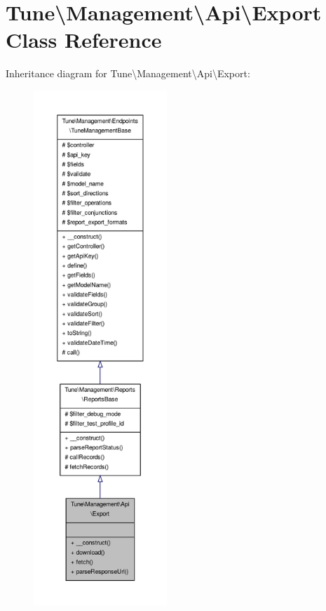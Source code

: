 \hypertarget{classTune_1_1Management_1_1Api_1_1Export}{\section{Tune\textbackslash{}Management\textbackslash{}Api\textbackslash{}Export Class Reference}
\label{classTune_1_1Management_1_1Api_1_1Export}
}


Inheritance diagram for Tune\textbackslash{}Management\textbackslash{}Api\textbackslash{}Export\-:
\nopagebreak
\begin{figure}[H]
\begin{center}
\leavevmode
\includegraphics[height=550pt]{classTune_1_1Management_1_1Api_1_1Export__inherit__graph}
\end{center}
\end{figure}


